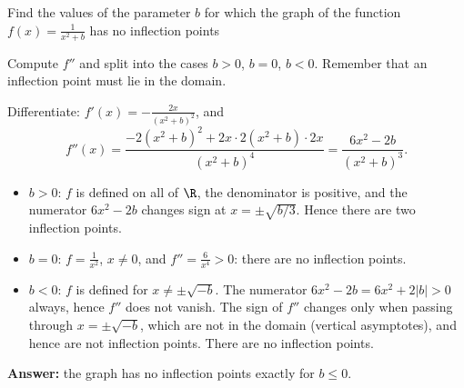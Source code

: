 
\begin{question}
Find the values of the parameter $b$ for which the graph of the function $\displaystyle f(x)=\frac{1}{x^2+b}$ has no inflection points
\end{question}

\begin{hint}
Compute $f''$ and split into the cases $b>0$, $b=0$, $b<0$. Remember that an inflection point must lie in the domain.
\end{hint}

\begin{solution}
Differentiate: $f'(x)=-\frac{2x}{(x^2+b)^2}$, and
\[ f''(x)=\frac{-2(x^2+b)^2+2x\cdot2(x^2+b)\cdot2x}{(x^2+b)^4}=\frac{6x^2-2b}{(x^2+b)^3}. \]
\begin{itemize}
  \item $b>0$: $f$ is defined on all of $\R$, the denominator is positive, and the numerator $6x^2-2b$ changes sign at $x=\pm\sqrt{b/3}$. Hence there are two inflection points.
  \item $b=0$: $f=\frac1{x^2}$, $x\neq0$, and $f''=\frac{6}{x^4}>0$: there are no inflection points.
  \item $b<0$: $f$ is defined for $x\neq\pm\sqrt{-b}$. The numerator $6x^2-2b=6x^2+2|b|>0$ always, hence $f''$ does not vanish. The sign of $f''$ changes only when passing through $x=\pm\sqrt{-b}$, which are not in the domain (vertical asymptotes), and hence are not inflection points. There are no inflection points.
\end{itemize}
\textbf{Answer:} the graph has no inflection points exactly for $\boxed{b\le 0}$.
\end{solution}
